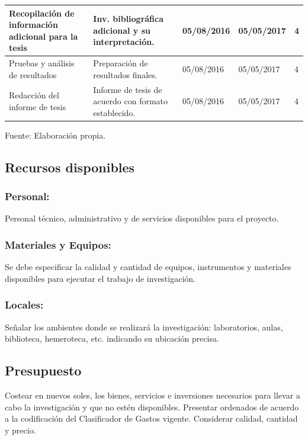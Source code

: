 \documentclass[a4paper, 12pt]{article}
\begin{document}
\begin{table}[h!]
\begin{tabular}{|p{3cm} |p{4cm} |p{2.2cm} |p{2.6cm} |p{2.3cm}|}
Recopilación de información adicional para la tesis & Inv. bibliográfica adicional y su interpretación.  & 05/08/2016 & 05/05/2017 & 4  \\ \hline

Pruebas y análisis de resultados & Preparación de resultados finales.  & 05/08/2016 & 05/05/2017 & 4  \\ \hline


Redacción del informe de tesis & Informe de tesis de acuerdo con formato establecido.  & 05/08/2016 & 05/05/2017 & 4  \\ \hline
\end{tabular}
\begin{center}
\vskip -0.2cm
{\small{Fuente: Elaboración propia.}}
\end{center}
\end{table}




\subsection{Recursos disponibles}
\subsubsection{{\bf Personal:}} Personal técnico, administrativo y de servicios disponibles para el proyecto.
\subsubsection{ {\bf	Materiales y Equipos:}} Se debe especificar la calidad y cantidad de equipos, instrumentos y materiales disponibles  para ejecutar el trabajo de investigación.
\subsubsection{{\bf Locales:}} Señalar los ambientes donde se realizará la investigación: laboratorios, aulas, biblioteca, hemeroteca, etc.  indicando su ubicación precisa.

\subsection{Presupuesto}
Costear en nuevos soles, los bienes, servicios e inversiones necesarios para llevar a cabo la investigación y que no estén disponibles. Presentar ordenados de acuerdo a la codificación del  Clasificador de Gastos vigente. Considerar calidad, cantidad y  precio.
\end{document}
